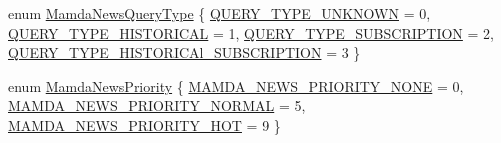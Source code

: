 \begin{CompactItemize}
enum \hyperlink{namespaceWombat_8c12fe7ccc6f40bd1efe733bb0673ad5}{Mamda\-News\-Query\-Type} \{ \hyperlink{namespaceWombat_8c12fe7ccc6f40bd1efe733bb0673ad55c713ba5ab789948b93cf6e70d5c37b1}{QUERY\_\-TYPE\_\-UNKNOWN} =  0, 
\hyperlink{namespaceWombat_8c12fe7ccc6f40bd1efe733bb0673ad5076b34ee37f1b83bb15428a827fe8370}{QUERY\_\-TYPE\_\-HISTORICAL} =  1, 
\hyperlink{namespaceWombat_8c12fe7ccc6f40bd1efe733bb0673ad59e0ea8f173e6cf63df5c6c5961664b31}{QUERY\_\-TYPE\_\-SUBSCRIPTION} =  2, 
\hyperlink{namespaceWombat_8c12fe7ccc6f40bd1efe733bb0673ad5f72c4ddeafb959494a17de7f698992db}{QUERY\_\-TYPE\_\-HISTORICAl\_\-SUBSCRIPTION} =  3
 \}
\item 
enum \hyperlink{namespaceWombat_faa7709d230f261c8aeb71420f6dd012}{Mamda\-News\-Priority} \{ \hyperlink{namespaceWombat_faa7709d230f261c8aeb71420f6dd0129bdd2dab593534227b732c109f87c77d}{MAMDA\_\-NEWS\_\-PRIORITY\_\-NONE} =  0, 
\hyperlink{namespaceWombat_faa7709d230f261c8aeb71420f6dd012dbe57685687a515bd562b6eb8864b554}{MAMDA\_\-NEWS\_\-PRIORITY\_\-NORMAL} =  5, 
\hyperlink{namespaceWombat_faa7709d230f261c8aeb71420f6dd012b1f0c267434b6c22ff31801c3cb5500a}{MAMDA\_\-NEWS\_\-PRIORITY\_\-HOT} =  9
 \}
\end{CompactItemize}
